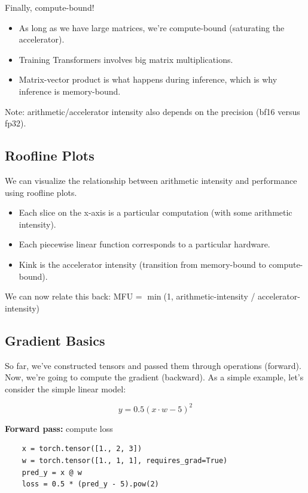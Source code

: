 \documentclass[12pt,twoside]{article}
\begin{document}
Finally, compute-bound! 

\begin{itemize}
    \item As long as we have large matrices, we're compute-bound (saturating the accelerator).
    \item Training Transformers involves big matrix multiplications.
    \item Matrix-vector product is what happens during inference, which is why inference is memory-bound.
\end{itemize}

Note: arithmetic/accelerator intensity also depends on the precision (bf16 versus fp32).

\subsection*{Roofline Plots}

We can visualize the relationship between arithmetic intensity and performance using roofline plots.

\begin{itemize}
    \item Each slice on the x-axis is a particular computation (with some arithmetic intensity).
    \item Each piecewise linear function corresponds to a particular hardware.
    \item Kink is the accelerator intensity (transition from memory-bound to compute-bound).
\end{itemize}

We can now relate this back: MFU = \(\min\)(1, arithmetic-intensity / accelerator-intensity)

\subsection*{Gradient Basics}

So far, we've constructed tensors and passed them through operations (forward). Now, we're going to compute the gradient (backward). As a simple example, let's consider the simple linear model:

\[
    y = 0.5 (x \cdot w - 5)^2
\]

\textbf{Forward pass:} compute loss

\begin{verbatim}
    x = torch.tensor([1., 2, 3])
    w = torch.tensor([1., 1, 1], requires_grad=True)
    pred_y = x @ w
    loss = 0.5 * (pred_y - 5).pow(2)
\end{verbatim}
\end{document}
